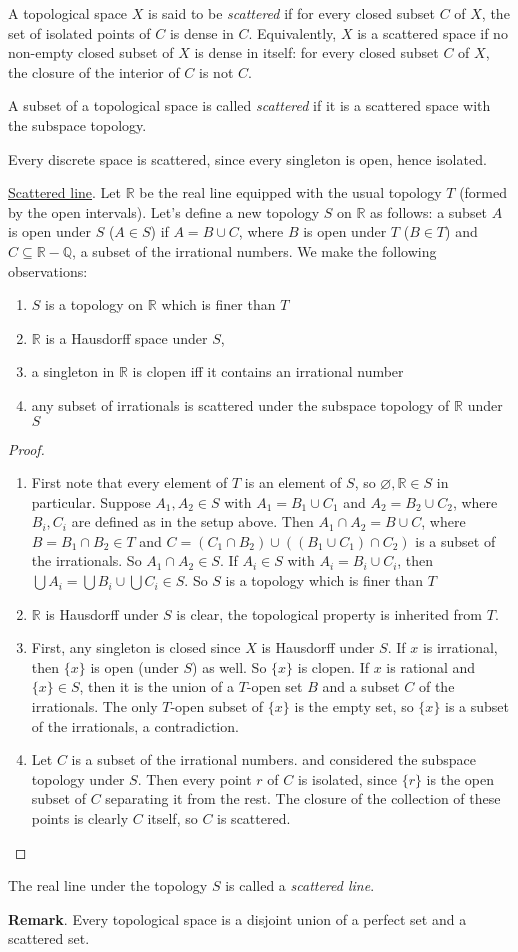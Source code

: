 \documentclass[12pt]{article}
\begin{document}
A topological space $X$ is said to be \emph{scattered} if for every closed subset $C$ of $X$, the set of isolated points of $C$ is dense in $C$.  Equivalently, $X$ is a scattered space if no non-empty closed subset of $X$ is dense in itself: for every closed subset $C$ of $X$, the closure of the interior of $C$ is not $C$.

A subset of a topological space is called \emph{scattered} if it is a scattered space with the subspace topology.

Every discrete space is scattered, since every singleton is open, hence isolated.

\underline{Scattered line}.  Let $\mathbb{R}$ be the real line equipped with the usual topology $T$ (formed by the open intervals).  Let's define a new topology $S$ on $\mathbb{R}$ as follows: a subset $A$ is open under $S$ ($A\in S$) if $A=B\cup C$, where $B$ is open under $T$ ($B\in T$) and $C\subseteq \mathbb{R}-\mathbb{Q}$, a subset of the irrational numbers.  We make the following observations:
\begin{enumerate}
\item $S$ is a topology on $\mathbb{R}$ which is finer than $T$
\item $\mathbb{R}$ is a Hausdorff space under $S$,
\item a singleton in $\mathbb{R}$ is clopen iff it contains an irrational number
\item any subset of irrationals is scattered under the subspace topology of $\mathbb{R}$ under $S$
\end{enumerate}
\begin{proof}
\begin{enumerate}
\item First note that every element of $T$ is an element of $S$, so $\varnothing, \mathbb{R}\in S$ in particular.  Suppose $A_1,A_2\in S$ with $A_1=B_1\cup C_1$ and $A_2=B_2\cup C_2$, where $B_i,C_i$ are defined as in the setup above.  Then $A_1\cap A_2= B\cup C$, where $B=B_1\cap B_2\in T$ and $C=(C_1\cap B_2)\cup ((B_1\cup C_1)\cap C_2)$ is a subset of the irrationals.  So $A_1\cap A_2\in S$.  If $A_i\in S$ with $A_i=B_i\cup C_i$, then $\bigcup A_i=\bigcup B_i\cup \bigcup C_i\in S$.  So $S$ is a topology which is finer than $T$
\item $\mathbb{R}$ is Hausdorff under $S$ is clear, the topological property is inherited from $T$.
\item First, any singleton is closed since $X$ is Hausdorff under $S$.  If $x$ is irrational, then $\lbrace x\rbrace$ is open (under $S$) as well.  So $\lbrace x\rbrace$ is clopen.  If $x$ is rational and $\lbrace x\rbrace\in S$, then it is the union of a $T$-open set $B$ and a subset $C$ of the irrationals.  The only $T$-open subset of $\lbrace x\rbrace$ is the empty set, so $\lbrace x\rbrace$ is a subset of the irrationals, a contradiction.
\item Let $C$ is a subset of the irrational numbers. and considered the subspace topology under $S$.  Then every point $r$ of $C$ is isolated, since $\lbrace r\rbrace$ is the open subset of $C$ separating it from the rest.  The closure of the collection of these points is clearly $C$ itself, so $C$ is scattered.
\end{enumerate}
\end{proof}
The real line under the topology $S$ is called a \emph{scattered line}.

\textbf{Remark}.  Every topological space is a disjoint union of a perfect set and a scattered set.
\end{document}
